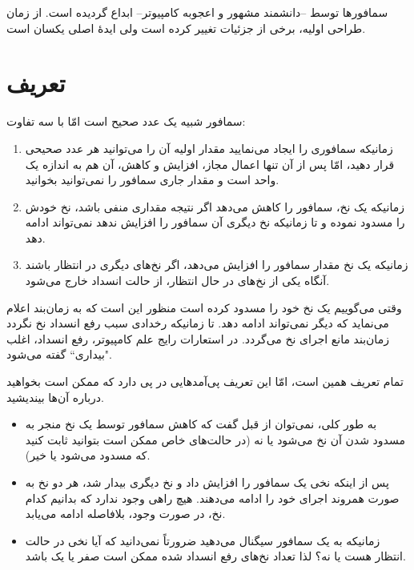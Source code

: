 \documentclass{book}
\begin{document}
    سمافورها توسط  --دانشمند مشهور و اعجوبه کامپیوتر-- ابداع گردیده است. 
    از زمان طراحی اولیه، برخی از جزئیات تغییر کرده است ولی ایدهٔ اصلی یکسان است. 

\section{تعریف}
    سمافور شبیه یک عدد صحیح است امّا با سه تفاوت: 

\begin{enumerate}

\item 
    زمانیکه سمافوری را ایجاد می‌نمایید مقدار اولیه آن را می‌توانید هر عدد صحیحی قرار دهید، 
    امّا پس از آن تنها اعمال مجاز، افزایش و کاهش، آن هم 
    به اندازه یک واحد است و مقدار جاری سمافور را نمی‌توانید بخوانید. 

\item 
    زمانیکه یک نخ، سمافور را کاهش می‌دهد اگر نتیجه  مقداری منفی باشد، نخ \space خودش را مسدود نموده 
    و تا زمانیکه نخ دیگری آن سمافور را افزایش ندهد نمی‌تواند ادامه دهد. 
\item 
    زمانیکه یک نخ مقدار سمافور را افزایش می‌دهد، اگر نخ‌های دیگری در انتظار باشند آنگاه یکی از نخ‌های در حال انتظار،‌ از حالت انسداد خارج می‌شود. 

\end{enumerate}

    وقتی می‌گوییم یک نخ خود را مسدود کرده است 
    منظور این است که به زمان‌بند اعلام می‌نماید که دیگر نمی‌تواند ادامه دهد. 
    تا زمانیکه رخدادی سبب رفع انسداد نخ نگردد زمان‌بند مانع اجرای نخ می‌گردد. 
    در استعارات رایج علم کامپیوتر، رفع انسداد، اغلب "بیداری`` گفته می‌شود.

    تمام تعریف همین است،‌ امّا این تعریف پی‌آمدهایی در پی دارد که ممکن است بخواهید درباره آن‌ها بیندیشید.
 
\begin{itemize}

\item 
    به طور کلی، نمی‌توان از قبل گفت که کاهش سمافور توسط یک نخ منجر به مسدود شدن آن نخ می‌شود یا نه 
    (در حالت‌های خاص ممکن است بتوانید ثابت کنید که مسدود می‌شود یا خیر).


\item 
    پس از اینکه نخی یک سمافور را افزایش داد و نخ دیگری بیدار شد، هر دو نخ به صورت همروند اجرای خود را ادامه می‌دهند. 
    هیچ راهی وجود ندارد که بدانیم کدام نخ، در صورت وجود، بلافاصله ادامه می‌یابد. 

\item 
    زمانیکه به یک سمافور سیگنال می‌دهید ضرورتاً نمی‌دانید که آیا نخی در حالت انتظار هست یا نه؟ لذا تعداد نخ‌های رفع انسداد شده ممکن است 
    صفر یا یک باشد. 

\end{itemize}
\end{document}
